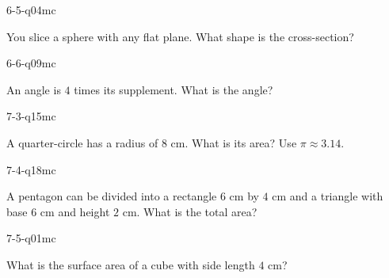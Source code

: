 \begin{practiceQuestion}{6-5-q04}{mc}
\begin{questionText}
You slice a sphere with any flat plane. What shape is the cross-section?
\end{questionText}
\end{practiceQuestion}

\begin{practiceQuestion}{6-6-q09}{mc}
\begin{questionText}
An angle is $4$ times its supplement. What is the angle?
\end{questionText}
\end{practiceQuestion}

\begin{practiceQuestion}{7-3-q15}{mc}
\begin{questionText}
A quarter-circle has a radius of $8$ cm. What is its area? Use $\pi \approx 3.14$.
\end{questionText}
\end{practiceQuestion}

\begin{practiceQuestion}{7-4-q18}{mc}
\begin{questionText}
A pentagon can be divided into a rectangle $6$ cm by $4$ cm and a triangle with base $6$ cm and height $2$ cm. What is the total area?
\end{questionText}
\end{practiceQuestion}

\begin{practiceQuestion}{7-5-q01}{mc}
\begin{questionText}
What is the surface area of a cube with side length $4$ cm?
\end{questionText}
\end{practiceQuestion}

